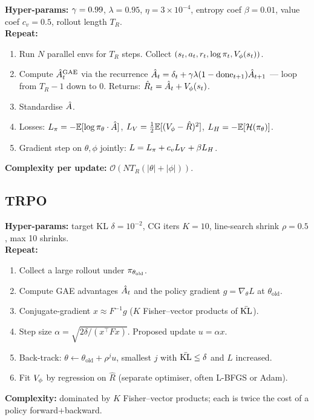\documentclass[11pt,oneside]{scrbook}
\begin{document}
\begin{tcolorbox}[colback=rlbg, colframe=rlblue, title=\textbf{Synchronous A2C + GAE}]
\textbf{Hyper-params:} $\gamma=0.99$, $\lambda=0.95$, $\eta=3\times 10^{-4}$, entropy coef $\beta = 0.01$, value coef $c_v = 0.5$, rollout length $T_R$.\\
\textbf{Repeat:}
\begin{enumerate}[leftmargin=*]
  \item Run $N$ parallel envs for $T_R$ steps. Collect $(s_t, a_t, r_t, \log\pi_t, V_\phi(s_t))$.
  \item Compute $\hat{A}_t^{\mathrm{GAE}}$ via the recurrence
        $\hat{A}_t = \delta_t + \gamma\lambda (1 - \mathrm{done}_{t+1}) \hat{A}_{t+1}$ ---
        loop from $T_R-1$ down to $0$. Returns: $\hat R_t = \hat{A}_t + V_\phi(s_t)$.
  \item Standardise $\hat{A}$.
  \item Losses:
        $L_\pi = -\mathbb{E}[\log\pi_\theta\cdot \hat{A}]$, $L_V = \tfrac12\mathbb{E}[(V_\phi - \hat R)^2]$, $L_H = -\mathbb{E}[\mathcal{H}(\pi_\theta)]$.
  \item Gradient step on $\theta, \phi$ jointly: $L = L_\pi + c_v L_V + \beta L_H$.
\end{enumerate}
\textbf{Complexity per update:} $\mathcal{O}(N T_R (|\theta|+|\phi|))$.
\end{tcolorbox}

\subsection*{TRPO}

\begin{tcolorbox}[colback=rlbg, colframe=rlblue, title=\textbf{TRPO}]
\textbf{Hyper-params:} target KL $\delta = 10^{-2}$, CG iters $K=10$, line-search shrink $\rho=0.5$, max 10 shrinks.\\
\textbf{Repeat:}
\begin{enumerate}[leftmargin=*]
  \item Collect a large rollout under $\pi_{\theta_\text{old}}$.
  \item Compute GAE advantages $\hat{A}_t$ and the policy gradient $g = \nabla_\theta L$ at $\theta_\text{old}$.
  \item Conjugate-gradient $x \approx F^{-1} g$ ($K$ Fisher--vector products of $\bar{\mathrm{KL}}$).
  \item Step size $\alpha = \sqrt{2\delta / (x^\top F x)}$. Proposed update $u = \alpha x$.
  \item Back-track: $\theta \leftarrow \theta_\text{old} + \rho^j u$, smallest $j$ with $\bar{\mathrm{KL}} \le \delta$ and $L$ increased.
  \item Fit $V_\phi$ by regression on $\hat R$ (separate optimiser, often L-BFGS or Adam).
\end{enumerate}
\textbf{Complexity:} dominated by $K$ Fisher--vector products; each is twice the cost of a policy forward+backward.
\end{tcolorbox}
\end{document}
